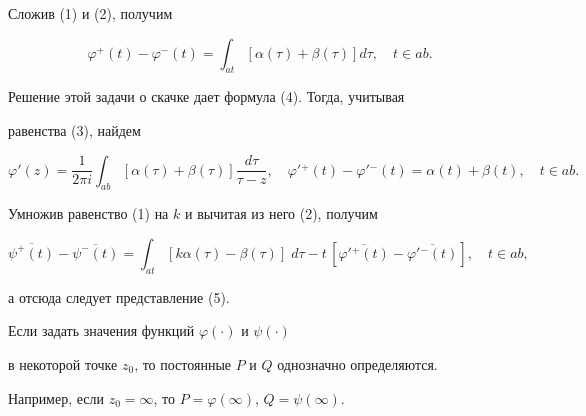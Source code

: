 \begin{pf}


Сложив (1) и (2), получим


$$


\varphi^+(t)-\varphi^-(t)=\int_{at}[\alpha(\tau)+\beta(\tau)]d\tau,


\quad t\in ab.


$$


Решение этой задачи о скачке дает формула (4). Тогда, учитывая


равенства (3), найдем


$$


\varphi'(z) = \frac{1}{2\pi i}\int_{ab} [\alpha(\tau)+\beta(\tau)]


\frac{d\tau}{\tau-z},\quad


\varphi'{}^+(t)-\varphi'{}^-(t) = \alpha(t)+\beta(t),\quad t\in ab.


$$


Умножив равенство (1) на $k$ и вычитая из него (2), получим


$$


\overline{\psi^+(t)} - \overline{\psi^-(t)} =


\int_{at} [k\alpha(\tau)-\beta(\tau)]\;d\tau


- t\,[\overline{\varphi'{}^+(t)} - \overline{\varphi'{}^-(t)}],


\quad t\in a b,


$$


а отсюда следует представление (5).


\end{pf}





Если задать значения функций $\varphi(\cdot)$ и $\psi(\cdot)$


в некоторой точке $z_0$, то постоянные $P$ и $Q$ однозначно определяются.


Например, если $z_0=\infty$, то $P=\varphi(\infty)$, $Q=\psi(\infty)$.





